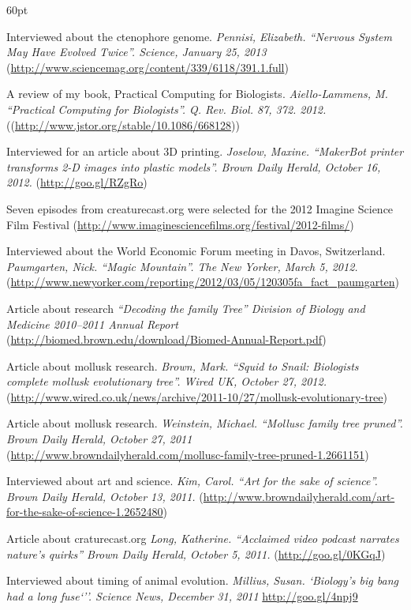 \begin{entry}{60pt}
\item [\rm 2013] Interviewed about the ctenophore genome. \emph{Pennisi, Elizabeth. ``Nervous System May Have Evolved Twice''. Science, January 25, 2013} (\url{http://www.sciencemag.org/content/339/6118/391.1.full})
\item [\rm 2012] A review of my book, Practical Computing for Biologists. \emph{Aiello-Lammens, M. ``Practical Computing for Biologists''. Q. Rev. Biol. 87, 372. 2012.} ((\url{http://www.jstor.org/stable/10.1086/668128}))
\item [\rm 2012] Interviewed for an article about 3D printing. \emph{Joselow, Maxine. ``MakerBot printer transforms 2-D images into plastic models''. Brown Daily Herald, October 16, 2012.} (\url{http://goo.gl/RZgRo})
\item [\rm 2012] Seven episodes from creaturecast.org were selected for the 2012 Imagine Science Film Festival (\url{http://www.imaginesciencefilms.org/festival/2012-films/})
\item [\rm 2012] Interviewed about the World Economic Forum meeting in Davos, Switzerland. \emph{Paumgarten, Nick. ``Magic Mountain''. The New Yorker, March 5, 2012.}  (\url{http://www.newyorker.com/reporting/2012/03/05/120305fa_fact_paumgarten})
\item [\rm 2012] Article about research \emph{``Decoding the family Tree'' Division of Biology and Medicine 2010--2011 Annual Report} (\url{http://biomed.brown.edu/download/Biomed-Annual-Report.pdf})
\item [\rm 2011] Article about mollusk research. \emph{Brown, Mark. ``Squid to Snail: Biologists complete mollusk evolutionary tree''. Wired UK, October 27, 2012.} (\url{http://www.wired.co.uk/news/archive/2011-10/27/mollusk-evolutionary-tree})
\item [\rm 2011] Article about mollusk research. \emph{Weinstein, Michael. ``Mollusc family tree pruned''. Brown Daily Herald, October 27, 2011} (\url{http://www.browndailyherald.com/mollusc-family-tree-pruned-1.2661151})
\item [\rm 2011] Interviewed about art and science. \emph{Kim, Carol. ``Art for the sake of science''. Brown Daily Herald, October 13, 2011.} (\url{http://www.browndailyherald.com/art-for-the-sake-of-science-1.2652480})
\item [\rm 2011] Article about craturecast.org \emph{Long, Katherine. ``Acclaimed video podcast narrates nature's quirks'' Brown Daily Herald, October 5, 2011.} (\url{http://goo.gl/0KGqJ})
\item [\rm 2011] Interviewed about timing of animal evolution. \emph{Millius, Susan. `Biology's big bang had a long fuse`''. Science News, December 31, 2011} \url{http://goo.gl/4npj9}

\end{entry}
